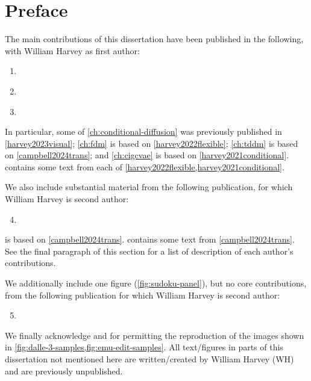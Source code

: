 
\chapter{Preface}

The main contributions of this dissertation have been published in the following, with William Harvey as first author:
\begin{enumerate}
    \item {} \label{harvey2023visual}
    \item {} \label{harvey2022flexible}
    \item {} \label{harvey2021conditional}
\end{enumerate}
In particular, some of \cref{ch:conditional-diffusion} was previously published in \cref{harvey2023visual}; \cref{ch:fdm} is based on \cref{harvey2022flexible}; \cref{ch:tddm} is based on \cref{campbell2024trans}; and \cref{ch:cigcvae} is based on \cref{harvey2021conditional}.  contains some text from each of \cref{harvey2022flexible,harvey2021conditional}.

We also include substantial material from the following publication, for which William Harvey is second author:
\begin{enumerate}
    \setcounter{enumi}{3}
    \item {} \label{campbell2024trans}
\end{enumerate}
 is based on \cref{campbell2024trans}.  contains some text from \cref{campbell2024trans}. See the final paragraph of this section for a list of description of each author's contributions.

We additionally include one figure (\cref{fig:sudoku-panel}), but no core contributions, from the following publication for which William Harvey is second author:
\begin{enumerate}
    \setcounter{enumi}{4}
    \item {} \label{weilbach2023graphically}
\end{enumerate}

We finally acknowledge \citeauthor{sheynin2023emu} and \citeauthor{betker2023improving} for permitting the reproduction of the images shown in \cref{fig:dalle-3-samples,fig:emu-edit-samples}. All text/figures in parts of this dissertation not mentioned here are written/created by William Harvey (WH) and are previously unpublished.

